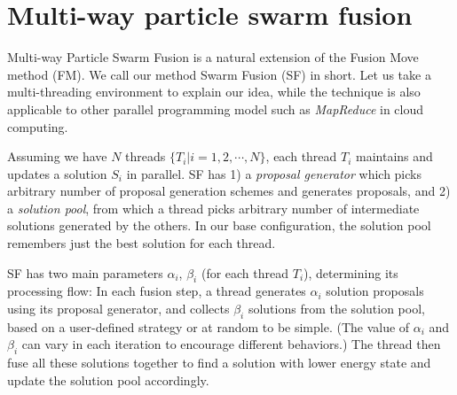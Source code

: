 \section{Multi-way particle swarm fusion} \label{section:algorithm}
Multi-way Particle Swarm Fusion is a natural extension of the Fusion
Move method (FM). We call our method Swarm Fusion (SF) in short. Let us
take a multi-threading environment to explain our idea, while the
technique is also applicable to other parallel programming model such as
{\it MapReduce} in cloud computing.
%

Assuming we have $N$ threads $\{T_i | i=1, 2, \cdots, N\}$,
each thread $T_i$ maintains and updates a solution $S_i$ in
parallel.
SF has 1) a {\it proposal generator} which picks
arbitrary number of proposal generation schemes and generates proposals,
and 2) a {\it solution pool}, from which a thread picks arbitrary number
of intermediate solutions generated by the others.
%
%
In our base configuration, the solution pool remembers just the best
solution for each thread.

SF has two main parameters $\alpha_i$, $\beta_i$ (for each thread
$T_i$), determining its processing flow: In each fusion step, a thread
generates $\alpha_i$ solution proposals using its proposal generator, and collects
$\beta_i$ solutions from the solution pool, based on a user-defined
strategy or at random to be simple. (The value of $\alpha_i$ and
$\beta_i$ can vary in each iteration to encourage different behaviors.)
The thread then fuse all these solutions together to find a solution
with lower energy state and update the solution pool accordingly.
%


